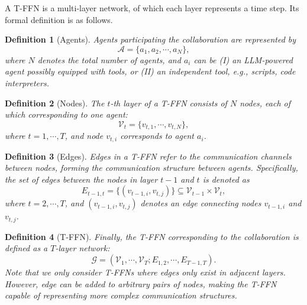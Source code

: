 \documentclass{article} %
\newtheorem{definition}{Definition}
\begin{document}
A T-FFN is a multi-layer network, of which each layer represents a time step. Its formal definition is as follows.


\begin{definition}[Agents]
    Agents participating the collaboration are represented by 
    \begin{equation}
        \mathcal{A} = \{a_1, a_2, \cdots, a_N \},\label{eq:A}
    \end{equation}
    where $N$ denotes the total number of agents, and $a_i$ can be (I) an LLM-powered agent possibly equipped with tools, or (II) an independent tool, e.g., scripts, code interpreters.
\end{definition}
\begin{definition}[Nodes]
    The $t$-th layer of a T-FFN consists of $N$ nodes, each of which corresponding to one agent:
    \begin{equation}
         \mathcal{V}_t=\{v_{t,1},\cdots,v_{t,N} \},
    \end{equation}
    where $t=1,\cdots,T$, and node $v_{t,i}$ corresponds to agent $a_i$.
\end{definition}
\begin{definition}[Edges]\label{def:edges}
    Edges in a T-FFN refer to the communication channels between nodes, forming the communication structure between agents. Specifically, the set of edges between the nodes in layer $t-1$ and $t$ is denoted as
    \begin{equation}
        E_{t-1,t}=\{(v_{t-1,i}, v_{t,j})\}\subseteq\mathcal{V}_{t-1}\times\mathcal{V}_t,
    \end{equation}
    where $t=2,\cdots,T$, and $(v_{t-1,i}, v_{t,j})$ denotes an edge connecting nodes $v_{t-1,i}$ and $v_{t,j}$.
\end{definition}
\begin{definition}[T-FFN]\label{def:t-ffn}
    Finally, the T-FFN corresponding to the collaboration is defined as a $T$-layer network:
    \begin{equation}
        \mathcal{G}=(\mathcal{V}_1, \cdots, \mathcal{V}_T; E_{1,2}, \cdots, E_{T-1,T}).
    \end{equation}
    Note that we only consider T-FFNs where edges only exist in adjacent layers. However, edge can be added to arbitrary pairs of nodes, making the T-FFN capable of representing more complex communication structures.
\end{definition}
\end{document}
